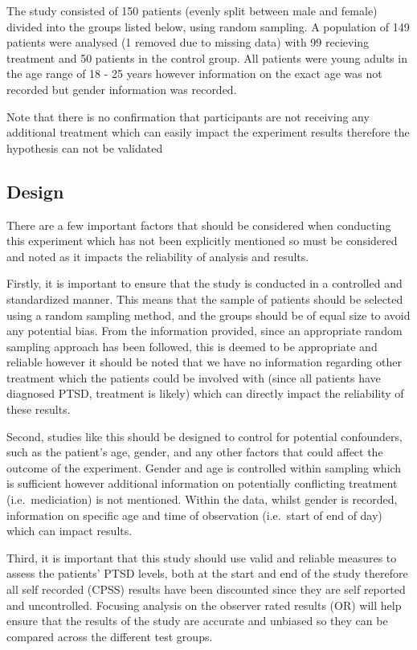 \documentclass[
  10pt,
]{article}
\begin{document}
The study consisted of 150 patients (evenly split between male and
female) divided into the groups listed below, using random sampling. A
population of 149 patients were analysed (1 removed due to missing data)
with 99 recieving treatment and 50 patients in the control group. All
patients were young adults in the age range of 18 - 25 years however
information on the exact age was not recorded but gender information was
recorded.

Note that there is no confirmation that participants are not receiving
any additional treatment which can easily impact the experiment results
therefore the hypothesis can not be validated

\hypertarget{design}{%
\subsection{Design}\label{design}}

There are a few important factors that should be considered when
conducting this experiment which has not been explicitly mentioned so
must be considered and noted as it impacts the reliability of analysis
and results.

Firstly, it is important to ensure that the study is conducted in a
controlled and standardized manner. This means that the sample of
patients should be selected using a random sampling method, and the
groups should be of equal size to avoid any potential bias. From the
information provided, since an appropriate random sampling approach has
been followed, this is deemed to be appropriate and reliable however it
should be noted that we have no information regarding other treatment
which the patients could be involved with (since all patients have
diagnosed PTSD, treatment is likely) which can directly impact the
reliability of these results.

Second, studies like this should be designed to control for potential
confounders, such as the patient's age, gender, and any other factors
that could affect the outcome of the experiment. Gender and age is
controlled within sampling which is sufficient however additional
information on potentially conflicting treatment (i.e.~mediciation) is
not mentioned. Within the data, whilst gender is recorded, information
on specific age and time of observation (i.e.~start of end of day) which
can impact results.

Third, it is important that this study should use valid and reliable
measures to assess the patients' PTSD levels, both at the start and end
of the study therefore all self recorded (CPSS) results have been
discounted since they are self reported and uncontrolled. Focusing
analysis on the observer rated results (OR) will help ensure that the
results of the study are accurate and unbiased so they can be compared
across the different test groups.
\end{document}
